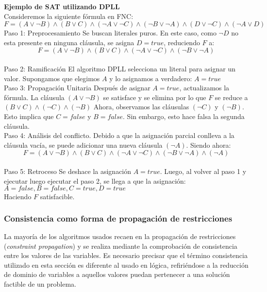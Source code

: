 \documentclass[runningheads]{llncs}
\begin{document}
\textbf{Ejemplo de SAT utilizando DPLL}\\

Consideremos la siguiente fórmula en FNC:
$F=(A\lor \neg B)\land(B\lor C)\land(\neg A\lor \neg C)\land(\neg B\lor \neg A)\land(D\lor \neg C)\land(\neg A\lor D)$\\

Paso 1: Preprocesamiento
Se buscan literales puros. En este caso, como $\neg D$ no esta presente en ninguna cláusula, se asigna $D=true$, reduciendo $F$ a:
$$F=(A\lor \neg B)\land(B\lor C)\land(\neg A\lor \neg C)\land(\neg B\lor \neg A)$$\\

Paso 2: Ramificación
El algoritmo DPLL selecciona un literal para asignar un valor. Supongamos que elegimos $A$ y lo asignamos a verdadero:
$A=true$\\

Paso 3: Propagación Unitaria
Después de asignar $A=true$, actualizamos la fórmula. La cláusula $(A\lor \neg B)$ se satisface y se elimina por lo que $F$ se reduce a $(B\lor C)\land(\neg C)\land(\neg B)$
Ahora, observamos las cláusulas $(\neg C)$ y $(\neg B)$. Esto implica que $C=false$ y $B=false$. Sin embargo, esto hace falsa la segunda cláusula.\\

Paso 4: Análisis del conflicto.
Debido a que la asignación parcial conlleva a la cláusula vacía, se puede adicionar una nueva cláusula $(\neg A)$. Siendo ahora:
$$F=(A\lor \neg B)\land(B\lor C)\land(\neg A\lor \neg C)\land(\neg B\lor \neg A)\land(\neg A)$$\\

Paso 5: Retroceso
Se deshace la asignación $A=true$. Luego, al volver al paso 1 y ejecutar luego ejecutar el paso 2, se llega a que la asignación:
$A=false, B=false,C=true, D=true$\\

Haciendo $F$ satisfacible.

\subsubsection{Consistencia como forma de propagación de restricciones\\}

La mayoría de los algoritmos usados recaen en la propagación de restricciones (\textit{constraint propagation}) y se realiza mediante la comprobación de consistencia entre los valores de las variables. Es necesario precisar que el término consistencia utilizado en esta sección es diferente al usado en lógica, refiriéndose a la reducción de dominio de variables a aquellos valores puedan pertenecer a una solución factible de un problema.\\
\end{document}
